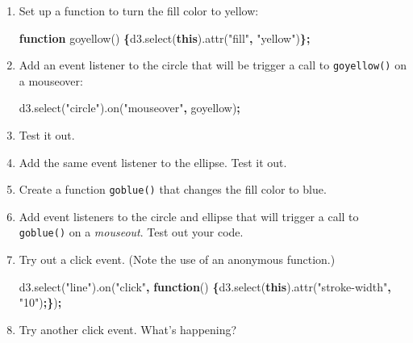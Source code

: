 \documentclass[]{book}
\newenvironment{Shaded}{\begin{snugshade}}{\end{snugshade}}
\newcommand{\AttributeTok}[1]{\textcolor[rgb]{0.77,0.63,0.00}{#1}}
\newcommand{\KeywordTok}[1]{\textcolor[rgb]{0.13,0.29,0.53}{\textbf{#1}}}
\newcommand{\NormalTok}[1]{#1}
\newcommand{\OperatorTok}[1]{\textcolor[rgb]{0.81,0.36,0.00}{\textbf{#1}}}
\newcommand{\StringTok}[1]{\textcolor[rgb]{0.31,0.60,0.02}{#1}}
\newcommand{\VariableTok}[1]{\textcolor[rgb]{0.00,0.00,0.00}{#1}}
\begin{document}
\begin{enumerate}
\def\labelenumi{\arabic{enumi}.}
\item
  Set up a function to turn the fill color to yellow:

\begin{Shaded}
\begin{Highlighting}[]
\KeywordTok{function} \AttributeTok{goyellow}\NormalTok{() }\OperatorTok{\{}\VariableTok{d3}\NormalTok{.}\AttributeTok{select}\NormalTok{(}\KeywordTok{this}\NormalTok{).}\AttributeTok{attr}\NormalTok{(}\StringTok{"fill"}\OperatorTok{,} \StringTok{"yellow"}\NormalTok{)}\OperatorTok{\};}
\end{Highlighting}
\end{Shaded}
\item
  Add an event listener to the circle that will be trigger a call to \texttt{goyellow()} on a mouseover:

\begin{Shaded}
\begin{Highlighting}[]
\VariableTok{d3}\NormalTok{.}\AttributeTok{select}\NormalTok{(}\StringTok{"circle"}\NormalTok{).}\AttributeTok{on}\NormalTok{(}\StringTok{"mouseover"}\OperatorTok{,}\NormalTok{ goyellow)}\OperatorTok{;}
\end{Highlighting}
\end{Shaded}
\item
  Test it out.
\item
  Add the same event listener to the ellipse. Test it out.
\item
  Create a function \texttt{goblue()} that changes the fill color to blue.
\item
  Add event listeners to the circle and ellipse that will trigger a call to \texttt{goblue()} on a \emph{mouseout}. Test out your code.
\item
  Try out a click event. (Note the use of an anonymous function.)

\begin{Shaded}
\begin{Highlighting}[]
\VariableTok{d3}\NormalTok{.}\AttributeTok{select}\NormalTok{(}\StringTok{"line"}\NormalTok{).}\AttributeTok{on}\NormalTok{(}\StringTok{"click"}\OperatorTok{,} \KeywordTok{function}\NormalTok{()}
  \OperatorTok{\{}\VariableTok{d3}\NormalTok{.}\AttributeTok{select}\NormalTok{(}\KeywordTok{this}\NormalTok{).}\AttributeTok{attr}\NormalTok{(}\StringTok{"stroke-width"}\OperatorTok{,} \StringTok{"10"}\NormalTok{)}\OperatorTok{;\}}\NormalTok{)}\OperatorTok{;}
\end{Highlighting}
\end{Shaded}
\item
  Try another click event. What's happening?


\end{enumerate}
\end{document}
